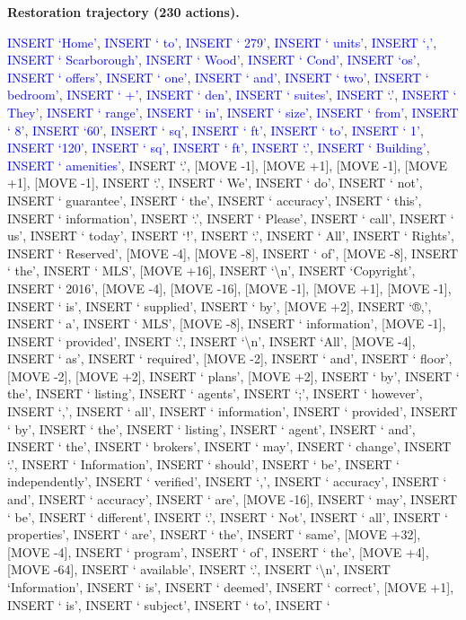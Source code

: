 \documentclass[11pt]{article}
\begin{document}
\vspace{0.4em}
\textbf{Restoration trajectory (230 actions).}\par
{
\ttfamily\scriptsize\raggedright\setlength{\parindent}{0pt}
\textcolor{blue}{INSERT `Home'}, \textcolor{blue}{INSERT ` to'}, \textcolor{blue}{INSERT ` 279'}, \textcolor{blue}{INSERT ` units'}, \textcolor{blue}{INSERT `,'}, \textcolor{blue}{INSERT ` Scarborough'}, \textcolor{blue}{INSERT ` Wood'}, \textcolor{blue}{INSERT ` Cond'}, \textcolor{blue}{INSERT `os'}, \textcolor{blue}{INSERT ` offers'}, \textcolor{blue}{INSERT ` one'}, \textcolor{blue}{INSERT ` and'}, \textcolor{blue}{INSERT ` two'}, \textcolor{blue}{INSERT ` bedroom'}, \textcolor{blue}{INSERT ` +'}, \textcolor{blue}{INSERT ` den'}, \textcolor{blue}{INSERT ` suites'}, \textcolor{blue}{INSERT `.'}, \textcolor{blue}{INSERT ` They'}, \textcolor{blue}{INSERT ` range'}, \textcolor{blue}{INSERT ` in'}, \textcolor{blue}{INSERT ` size'}, \textcolor{blue}{INSERT ` from'}, \textcolor{blue}{INSERT ` 8'}, \textcolor{blue}{INSERT `60'}, \textcolor{blue}{INSERT ` sq'}, \textcolor{blue}{INSERT ` ft'}, \textcolor{blue}{INSERT ` to'}, \textcolor{blue}{INSERT ` 1'}, \textcolor{blue}{INSERT `120'}, \textcolor{blue}{INSERT ` sq'}, \textcolor{blue}{INSERT ` ft'}, \textcolor{blue}{INSERT `.'}, \textcolor{blue}{INSERT ` Building'}, \textcolor{blue}{INSERT ` amenities'}, INSERT `.', [MOVE -1], [MOVE +1], [MOVE -1], [MOVE +1], [MOVE -1], INSERT `.', INSERT ` We', INSERT ` do', INSERT ` not', INSERT ` guarantee', INSERT ` the', INSERT ` accuracy', INSERT ` this', INSERT ` information', INSERT `.', INSERT ` Please', INSERT ` call', INSERT ` us', INSERT ` today', INSERT `!', INSERT `.', INSERT ` All', INSERT ` Rights', INSERT ` Reserved', [MOVE -4], [MOVE -8], INSERT ` of', [MOVE -8], INSERT ` the', INSERT ` MLS', [MOVE +16], INSERT `\textbackslash{}n', INSERT `Copyright', INSERT ` 2016', [MOVE -4], [MOVE -16], [MOVE -1], [MOVE +1], [MOVE -1], INSERT ` is', INSERT ` supplied', INSERT ` by', [MOVE +2], INSERT `®,', INSERT ` a', INSERT ` MLS', [MOVE -8], INSERT ` information', [MOVE -1], INSERT ` provided', INSERT `.', INSERT `\textbackslash{}n', INSERT `All', [MOVE -4], INSERT ` as', INSERT ` required', [MOVE -2], INSERT ` and', INSERT ` floor', [MOVE -2], [MOVE +2], INSERT ` plans', [MOVE +2], INSERT ` by', INSERT ` the', INSERT ` listing', INSERT ` agents', INSERT `;', INSERT ` however', INSERT `,', INSERT ` all', INSERT ` information', INSERT ` provided', INSERT ` by', INSERT ` the', INSERT ` listing', INSERT ` agent', INSERT ` and', INSERT ` the', INSERT ` brokers', INSERT ` may', INSERT ` change', INSERT `.', INSERT ` Information', INSERT ` should', INSERT ` be', INSERT ` independently', INSERT ` verified', INSERT `,', INSERT ` accuracy', INSERT ` and', INSERT ` accuracy', INSERT ` are', [MOVE -16], INSERT ` may', INSERT ` be', INSERT ` different', INSERT `.', INSERT ` Not', INSERT ` all', INSERT ` properties', INSERT ` are', INSERT ` the', INSERT ` same', [MOVE +32], [MOVE -4], INSERT ` program', INSERT ` of', INSERT ` the', [MOVE +4], [MOVE -64], INSERT ` available', INSERT `.', INSERT `\textbackslash{}n', INSERT `Information', INSERT ` is', INSERT ` deemed', INSERT ` correct', [MOVE +1], INSERT ` is', INSERT ` subject', INSERT ` to', INSERT ` }
\end{document}
